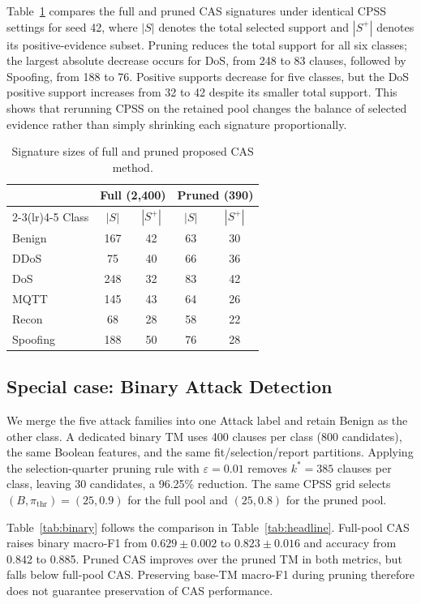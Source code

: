 \documentclass[conference]{IEEEtran}
\begin{document}
Table~\ref{tab:reduction} compares the full and pruned CAS signatures
under identical CPSS settings for seed 42, where $|S|$ denotes the
total selected support and $|S^+|$ denotes its positive-evidence subset.
Pruning reduces the total support for all six classes; the largest
absolute decrease occurs for DoS, from 248 to 83 clauses, followed by
Spoofing, from 188 to 76. Positive supports decrease for five classes,
but the DoS positive support increases from 32 to 42 despite its smaller
total support. This shows that rerunning CPSS on the retained pool
changes the balance of selected evidence rather than simply shrinking
each signature proportionally.

\begin{table}[!htb]
\centering
\caption{Signature sizes of full and pruned proposed CAS method.}
\label{tab:reduction}
\footnotesize
\begin{tabular}{@{}lcccc@{}}
\toprule
& \multicolumn{2}{c}{Full (2,400)} & \multicolumn{2}{c}{Pruned (390)} \\
\cmidrule(lr){2-3}\cmidrule(lr){4-5}
Class & $|S|$ & $|S^+|$ & $|S|$ & $|S^+|$ \\
\midrule
Benign & 167 & 42 & 63 & 30 \\
DDoS & 75 & 40 & 66 & 36 \\
DoS & 248 & 32 & 83 & 42 \\
MQTT & 145 & 43 & 64 & 26 \\
Recon & 68 & 28 & 58 & 22 \\
Spoofing & 188 & 50 & 76 & 28 \\
\bottomrule
\end{tabular}
\end{table}

\subsection{Special case: Binary Attack Detection}
\label{sec:binary}
We merge the five attack families into one Attack label and retain
Benign as the other class. A dedicated binary TM uses 400 clauses
per class (800 candidates), the same Boolean features, and the same
fit/selection/report partitions. Applying the selection-quarter pruning
rule with $\varepsilon=0.01$ removes $k^*=385$ clauses per class,
leaving 30 candidates, a 96.25\% reduction. The same CPSS grid selects
$(B,\pi_{\mathrm{thr}})=(25,0.9)$ for the full pool and $(25,0.8)$
for the pruned pool.

Table~\ref{tab:binary} follows the comparison in
Table~\ref{tab:headline}. Full-pool CAS raises binary macro-F1 from
$0.629\pm0.002$ to $0.823\pm0.016$ and accuracy from 0.842 to
0.885. Pruned CAS improves over the pruned TM in both metrics, but
falls below full-pool CAS. Preserving base-TM macro-F1 during pruning
therefore does not guarantee preservation of CAS performance.
\end{document}

